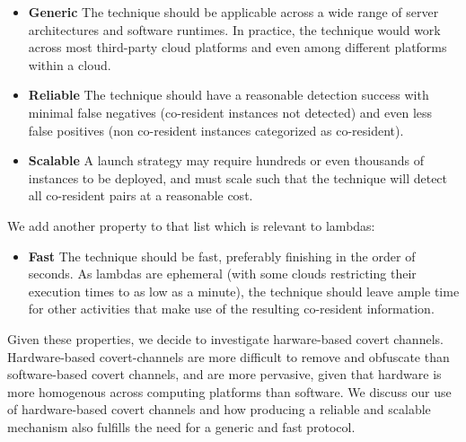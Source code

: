 \begin{itemize}
    \item \textbf{Generic} The technique should be applicable across a wide
    range of server architectures and software runtimes. In practice, the
    technique would work across most third-party cloud platforms and even 
    among different platforms within a cloud.
    \item \textbf{Reliable} The technique should have a reasonable detection success
    with minimal false negatives (co-resident instances not detected) and even 
    less false positives (non co-resident instances categorized as co-resident).
    \item \textbf{Scalable} A launch strategy may require hundreds or even
    thousands of instances to be deployed, and must scale such that the
    technique will detect all co-resident pairs at a reasonable cost.
\end{itemize}

\noindent We add another property to that list which is relevant to lambdas:
\begin{itemize}
    \item \textbf{Fast} The technique should be fast, preferably finishing in 
    the order of seconds. As lambdas are ephemeral (with some clouds restricting their 
    execution times to as low as a minute), the technique should leave ample time 
    for other activities that make use of the resulting co-resident information.
\end{itemize}


Given these properties, we decide to investigate harware-based covert channels.
Hardware-based covert-channels are more difficult to remove and obfuscate than
software-based covert channels, and are more pervasive, given that hardware is
more homogenous across computing platforms than software.  We discuss our use of
hardware-based covert channels and how producing a reliable and scalable
mechanism also fulfills the need for a generic and fast protocol.

